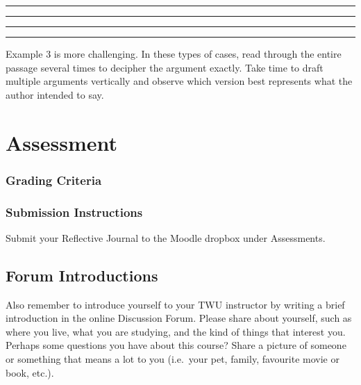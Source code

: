 \documentclass[
]{book}
\begin{document}
\begin{center}\rule{0.5\linewidth}{0.5pt}\end{center}

\begin{center}\rule{0.5\linewidth}{0.5pt}\end{center}

\begin{center}\rule{0.5\linewidth}{0.5pt}\end{center}

\begin{center}\rule{0.5\linewidth}{0.5pt}\end{center}

Example 3 is more challenging. In these types of cases, read through the entire passage several times to decipher the argument exactly. Take time to draft multiple arguments vertically and observe which version best represents what the author intended to say.

\hypertarget{assessment-1}{%
\section*{Assessment}\label{assessment-1}}

\hypertarget{grading-criteria-1}{%
\subsubsection*{Grading Criteria}\label{grading-criteria-1}}

\hypertarget{submission-instructions-1}{%
\subsubsection*{Submission Instructions}\label{submission-instructions-1}}

Submit your Reflective Journal to the Moodle dropbox under Assessments.

\hypertarget{forum-introductions-1}{%
\subsection*{Forum Introductions}\label{forum-introductions-1}}

Also remember to introduce yourself to your TWU instructor by writing a brief introduction in the online Discussion Forum. Please share about yourself, such as where you live, what you are studying, and the kind of things that interest you. Perhaps some questions you have about this course? Share a picture of someone or something that means a lot to you (i.e.~your pet, family, favourite movie or book, etc.).
\end{document}
